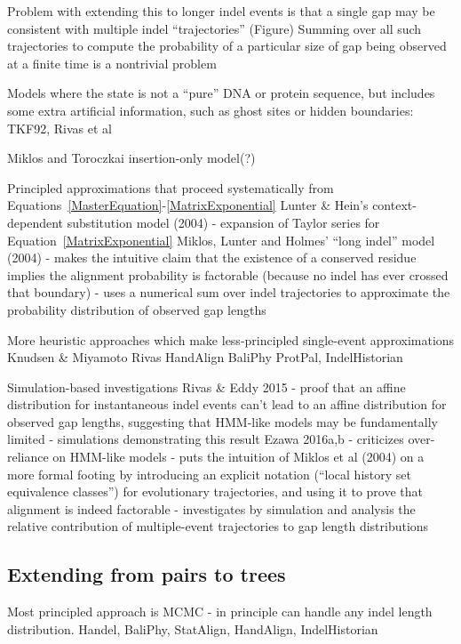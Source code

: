 \documentclass{bmcart}
\newcommand{\eqref}[1]{Equation~\ref{#1}}
\begin{document}
Problem with extending this to longer indel events is that a single gap may be consistent with
multiple indel ``trajectories'' (Figure)
Summing over all such trajectories to compute the probability of a particular size of gap being observed at a finite time
is a nontrivial problem

Models where the state is not a ``pure'' DNA or protein sequence,
but includes some extra artificial information,
such as ghost sites or hidden boundaries:
TKF92,
Rivas et al

Miklos and Toroczkai insertion-only model(?) \cite{MiklosEtal2001}

Principled approximations that proceed systematically from Equations~\ref{MasterEquation}-\ref{MatrixExponential}
Lunter \& Hein's context-dependent substitution model (2004)
 - expansion of Taylor series for \eqref{MatrixExponential}
Miklos, Lunter and Holmes' ``long indel'' model (2004)
 - makes the intuitive claim that the existence of a conserved residue implies the alignment probability is factorable (because no indel has ever crossed that boundary)
 - uses a numerical sum over indel trajectories to approximate the probability distribution of observed gap lengths

More heuristic approaches which make less-principled single-event approximations
Knudsen \& Miyamoto
Rivas
HandAlign
BaliPhy
ProtPal, IndelHistorian

Simulation-based investigations
Rivas \& Eddy 2015
 - proof that an affine distribution for instantaneous indel events can't lead to an affine distribution for observed gap lengths, suggesting that HMM-like models may be fundamentally limited
 - simulations demonstrating this result
Ezawa 2016a,b
 - criticizes over-reliance on HMM-like models
 - puts the intuition of Miklos et al (2004) on a more formal footing by introducing an explicit notation (``local history set equivalence classes'') for evolutionary trajectories, and using it to prove that alignment is indeed factorable
 - investigates by simulation and analysis the relative contribution of multiple-event trajectories to gap length distributions


\subsection*{Extending from pairs to trees}

Most principled approach is MCMC - in principle can handle any indel length distribution.
Handel,
BaliPhy,
StatAlign,
HandAlign,
IndelHistorian
\end{document}
